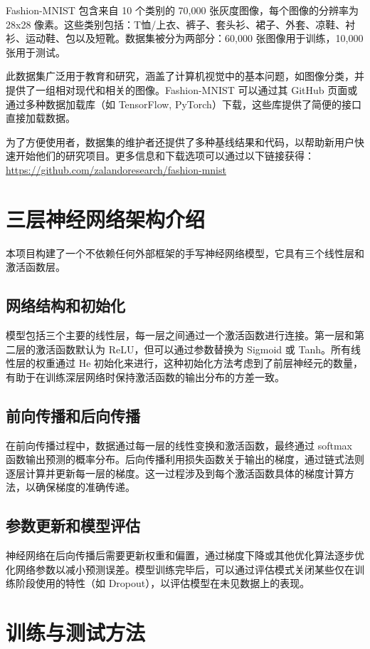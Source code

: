 \documentclass[a4paper,12pt]{article}
\begin{document}
Fashion-MNIST 包含来自 10 个类别的 70,000 张灰度图像，每个图像的分辨率为 28x28 像素。这些类别包括：T恤/上衣、裤子、套头衫、裙子、外套、凉鞋、衬衫、运动鞋、包以及短靴。数据集被分为两部分：60,000 张图像用于训练，10,000 张用于测试。

此数据集广泛用于教育和研究，涵盖了计算机视觉中的基本问题，如图像分类，并提供了一组相对现代和相关的图像。Fashion-MNIST 可以通过其 GitHub 页面或通过多种数据加载库（如 TensorFlow, PyTorch）下载，这些库提供了简便的接口直接加载数据。

为了方便使用者，数据集的维护者还提供了多种基线结果和代码，以帮助新用户快速开始他们的研究项目。更多信息和下载选项可以通过以下链接获得：\url{https://github.com/zalandoresearch/fashion-mnist}

\section{三层神经网络架构介绍}

本项目构建了一个不依赖任何外部框架的手写神经网络模型，它具有三个线性层和激活函数层。

\subsection{网络结构和初始化}
模型包括三个主要的线性层，每一层之间通过一个激活函数进行连接。第一层和第二层的激活函数默认为 ReLU，但可以通过参数替换为 Sigmoid 或 Tanh。所有线性层的权重通过 He 初始化来进行，这种初始化方法考虑到了前层神经元的数量，有助于在训练深层网络时保持激活函数的输出分布的方差一致。

\subsection{前向传播和后向传播}
在前向传播过程中，数据通过每一层的线性变换和激活函数，最终通过 softmax 函数输出预测的概率分布。后向传播利用损失函数关于输出的梯度，通过链式法则逐层计算并更新每一层的梯度。这一过程涉及到每个激活函数具体的梯度计算方法，以确保梯度的准确传递。

\subsection{参数更新和模型评估}
神经网络在后向传播后需要更新权重和偏置，通过梯度下降或其他优化算法逐步优化网络参数以减小预测误差。模型训练完毕后，可以通过评估模式关闭某些仅在训练阶段使用的特性（如 Dropout），以评估模型在未见数据上的表现。


\section{训练与测试方法}
\end{document}
